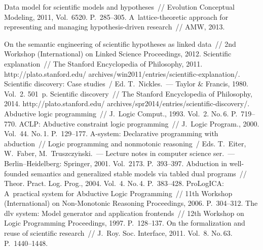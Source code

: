 \begin{multicols}{2}
{{\begin{thebibliography}{99}
 Data model for scientific models and hypotheses~//
Evolution Conceptual Modeling, 2011, Vol.~6520. P.~285--305.
 A~lattice-theoretic approach for
representing and managing hypothesis-driven research~// AMW, 2013.

 On the semantic
engineering of scientific hypotheses as linked data~// 2nd Workshop (International)
on Linked Science Proceedings, 2012.
 Scientific explanation~// The Stanford Encyclopedia of
Philosophy, 2011. {\sf http://plato.stanford.edu/ archives/win2011/entries/scientific-explanation/}.
Scientific discovery: Case studies~/
Ed. T.~Nickles.~--- Taylor \& Francis, 1980. Vol.~2. 501~p.
 Scientific discovery~// The Stanford Encyclopedia of Philosophy,
2014. {\sf http://plato.stanford.edu/ archives/spr2014/entries/scientific-discovery/}.
 Abductive logic programming~//
J.~Logic Comput., 1993.  Vol.~2. No.\,6.  P.~719--770.
 ACLP: Abductive constraint logic
programming~// J.~Logic Program., 2000. Vol.~44. No.\,1. P.~129--177.
 A-system: Declarative programming with
abduction~// Logic programming and nonmotonic reasoning~/
Eds. T.~Eiter, W.~Faber, M.~Truszczy$\acute{\mbox{n}}$ski.~---
Lecture notes in computer science ser.~--- Berlin--Heidelberg:
Springer, 2001. Vol.~2173. P.~393--397.
 Abduction in well-founded semantics and
generalized stable models via tabled dual programs~// Theor. Pract. Log. Prog.,
2004. Vol.~4. No.\,4.
P.~383--428.
 ProLogICA: A~practical system for Abductive Logic
Programming~// 11th Workshop (International) on Non-Monotonic Reasoning
Proceedings, 2006. P.~304--312.
The dlv system: Model generator and application frontends~// 12th Workshop on
Logic Programming Proceedings, 1997.  P.~128--137.
 On the
formalization and reuse of scientific research~// J.~Roy. Soc. Interface,
2011. Vol.~8. No.\,63.  P.~1440--1448.

\end{thebibliography}}}
\end{multicols}
